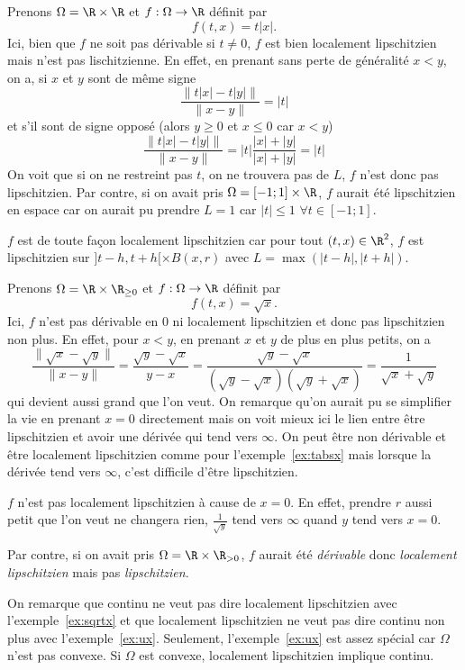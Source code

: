 \begin{myexem}
  \label{ex:tabsx}
  Prenons $\Omega = \R\times\R$ et $f:\Omega\to\R$ définit par
  \[
    f(t,x) = t|x|.
  \]
  Ici, bien que $f$ ne soit pas dérivable si $t \neq 0$,
  $f$ est bien localement lipschitzien
  mais n'est pas lischitzienne.
  En effet, en prenant sans perte de généralité $x < y$, on a,
  si $x$ et $y$ sont de même signe
  \[ \frac{\|t|x| - t|y|\|}{\|x-y\|} = |t| \]
  et s'il sont de signe opposé (alors $y \geq 0$ et $x \leq 0$ car $x < y$)
  \[ \frac{\|t|x| - t|y|\|}{\|x-y\|}
  = |t|\frac{|x|+|y|}{|x|+|y|} = |t| \]
  On voit que si on ne restreint pas $t$, on ne trouvera pas
  de $L$, $f$ n'est donc pas lipschitzien.
  Par contre, si on avait pris $\Omega = [-1;1]\times\R$,
  $f$ aurait été lipschitzien en espace car on aurait pu prendre $L = 1$
  car $|t| \leq 1$ $\forall t \in [-1;1]$.

  $f$ est de toute façon localement lipschitzien car pour tout
  $(t,x) \in \R^2$, $f$ est lipschitzien sur $]t-h,t+h[ \times B(x,r)$ avec
  $L = \max(|t-h|,|t+h|)$.
\end{myexem}
\begin{myexem}
  \label{ex:sqrtx}
  Prenons $\Omega = \R\times\R_{\geq 0}$ et $f:\Omega\to\R$ définit par
  \[
    f(t,x) = \sqrt{x}.
  \]
  Ici, $f$ n'est pas dérivable en 0 ni localement lipschitzien
  et donc pas lipschitzien non plus.
  En effet, pour $x < y$, en prenant $x$ et $y$ de plus en plus petits,
  on a
  \[ \frac{\|\sqrt{x}-\sqrt{y}\|}{\|x-y\|} =
  \frac{\sqrt{y} - \sqrt{x}}{y-x} =
  \frac{\sqrt{y} - \sqrt{x}}{(\sqrt{y} - \sqrt{x})(\sqrt{y} + \sqrt{x})}
  = \frac{1}{\sqrt{x}+\sqrt{y}} \]
  qui devient aussi grand que l'on veut.
  On remarque qu'on aurait pu se simplifier la vie en prenant $x = 0$
  directement mais on voit mieux ici le lien entre être lipschitzien et avoir
  une dérivée qui tend vers $\infty$.
  On peut être non dérivable et être localement lipschitzien comme pour
  l'exemple~\ref{ex:tabsx} mais
  lorsque la dérivée tend vers $\infty$, c'est difficile d'être
  lipschitzien.

  $f$ n'est pas localement lipschitzien à cause de $x=0$.
  En effet, prendre $r$ aussi petit que l'on veut ne changera rien,
  $\frac{1}{\sqrt{y}}$ tend vers $\infty$ quand $y$ tend vers $x = 0$.

  Par contre, si on avait pris $\Omega = \R \times \R_{>0}$, $f$
  aurait été \emph{dérivable} donc \emph{localement lipschitzien} mais
  pas \emph{lipschitzien}.
\end{myexem}
On remarque que continu ne veut pas dire localement lipschitzien avec
l'exemple~\ref{ex:sqrtx} et que localement lipschitzien ne veut pas
dire continu non plus avec l'exemple~\ref{ex:ux}.
Seulement, l'exemple~\ref{ex:ux} est assez spécial car $\Omega$ n'est pas
convexe.
Si $\Omega$ est convexe, localement lipschitzien implique continu.

